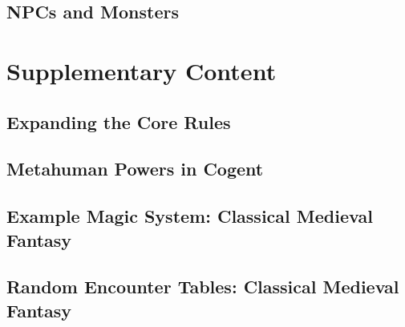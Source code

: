 \newpage
\chapter{NPCs and Monsters} \label{ch:na.nps_and_monsters}


\cleardoublepage
\part{Supplementary Content} \label{part:supplementary}

\newpage
\chapter{Expanding the Core Rules} \label{ch:su.expanding_core_rules}


\newpage
\chapter{Metahuman Powers in Cogent} \label{ch:su.metahuman_powers}


\newpage
\chapter{Example Magic System: Classical Medieval Fantasy} \label{ch:su.classic_fantasy_system}


\newpage
\chapter{Random Encounter Tables: Classical Medieval Fantasy} \label{ch:su.random_encounter_tables}

%
%

%


